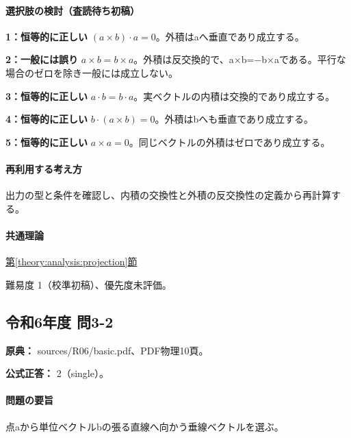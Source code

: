 \paragraph{選択肢の検討（査読待ち初稿）}\mbox{}\par

\noindent\textbf{1：恒等的に正しい} \((a\times b)\cdot a=0\)。外積はaへ垂直であり成立する。\par

\noindent\textbf{2：一般には誤り} \(a\times b=b\times a\)。外積は反交換的で、a×b=−b×aである。平行な場合のゼロを除き一般には成立しない。\par

\noindent\textbf{3：恒等的に正しい} \(a\cdot b=b\cdot a\)。実ベクトルの内積は交換的であり成立する。\par

\noindent\textbf{4：恒等的に正しい} \(b\cdot(a\times b)=0\)。外積はbへも垂直であり成立する。\par

\noindent\textbf{5：恒等的に正しい} \(a\times a=0\)。同じベクトルの外積はゼロであり成立する。\par

\paragraph{再利用する考え方} 出力の型と条件を確認し、内積の交換性と外積の反交換性の定義から再計算する。

\paragraph{共通理論} \hyperref[theory:analysis:projection]{第\ref*{theory:analysis:projection}節}

\par 難易度 1（校準初稿）、優先度未評価。

\subsection{令和6年度 問3-2}
\label{q:r06-reg-basic-3-2}

\noindent\textbf{原典：} sources/R06/basic.pdf、PDF物理10頁。

\textbf{公式正答：} 2（single）。

\paragraph{問題の要旨} 点aから単位ベクトルbの張る直線へ向かう垂線ベクトルを選ぶ。

